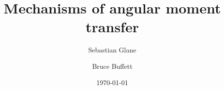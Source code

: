 \documentclass[%
	paper=letter,
	twoside=false,
	fontsize=12pt,
	titlepage=false,
	listof=totoc,
	bibliography=totoc,
	listof=flat,
	cleardoublepage=empty,
	headsepline=true,
	footsepline=false,
	captions=tableheading,
	numbers=noendperiod,
	headings=normal,
]{scrartcl}
\numberwithin{equation}{section}
\numberwithin{figure}{section}
\numberwithin{table}{section}
\begin{document}
\subject{Core mantle interactions of the Earth}
\title{Mechanisms of angular moment transfer}
\author{Sebastian Glane \and Bruce Buffett}
\date{\today}
\maketitle
\tableofcontents

\cleardoublepage
\printbibliography
\end{document}
